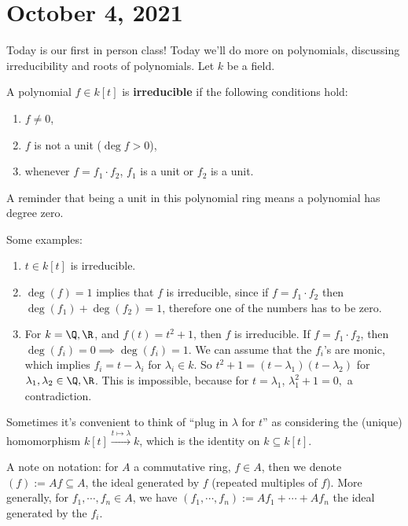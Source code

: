 \section{October 4, 2021} 
Today is our first in person class! Today we'll do more on polynomials, discussing irreducibility and roots of polynomials.
Let $k$ be a field.
\begin{definition}[]
    A polynomial $f \in k[t]$ is \textbf{irreducible} if the following conditions hold:
    \begin{enumerate}[label=(\arabic*)]
    \setlength\itemsep{-.2em}
\item $f\neq 0$,
\item $f$ is not a unit ($\deg f > 0$),
        \item whenever $f=f_1 \cdot f_2$, $f_1$ is a unit or $f_2$ is a unit.
    \end{enumerate}
\end{definition}
A reminder that being a unit in this polynomial ring means a polynomial has degree zero.
\begin{example}Some examples:
    \begin{enumerate}[label=(\arabic*)]
    \setlength\itemsep{-.2em}
\item  $t \in k[t]$ is irreducible.
\item $\deg(f)=1$ implies that $f$ is irreducible, since if $f=f_1\cdot f_2$ then $\deg(f_1)+\deg(f_2)=1$, therefore one of the numbers has to be zero.
\item For $k=\Q,\R$, and $f(t)=t^2 +1$, then $f$ is irreducible. If $f=f_1\cdot f_2$, then $\deg(f_i)=0 \implies \deg(f_i)=1$. We can assume that the $f_i $'s are monic, which implies $f_i =t-\lambda _i $ for $\lambda _i  \in k$. So $t^2+1=(t-\lambda_1)(t-\lambda_2)$ for $\lambda_1,\lambda_2 \in \Q,\R$. This is impossible, because for $t=\lambda_1$, $\lambda_1^2+1=0,$ a contradiction.
    \end{enumerate}
\end{example}
\begin{remark}
    Sometimes it's convenient to think of ``plug in $\lambda$ for $t$'' as considering the (unique) homomorphism $k[t] \xrightarrow{t \mapsto \lambda}  k$, which is the identity on $k \subseteq k[t]$.
\end{remark}
\begin{note}
    A note on notation: for $A$ a commutative ring, $f \in A$, then we denote $(f):=A f \subseteq A$, the ideal generated by $f$ (repeated multiples of $f$). More generally, for $f_1,\cdots ,f_n  \in A$, we have $(f_1, \cdots , f_n ):= Af_1 +\cdots + Af_n $ the ideal generated by the $f_i $.
\end{note}
